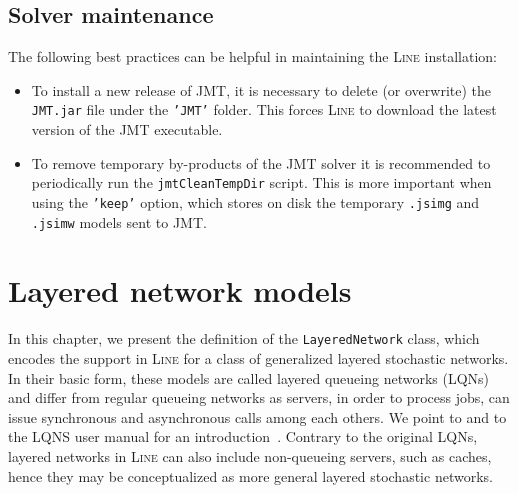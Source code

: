 \begin{MATLAB}
\section{Solver maintenance}
The following best practices can be helpful in maintaining the \textsc{Line} installation:
\begin{itemize}
\item To install a new release of JMT, it is necessary to delete (or overwrite) the \texttt{JMT.jar} file under the \texttt{'JMT'} folder. This forces \textsc{Line} to download the latest version of the JMT executable.
\item To remove temporary by-products of the JMT solver it is recommended to periodically run the \texttt{jmtCleanTempDir} script. This is more important when using the \texttt{'keep'} option, which stores on disk the temporary \texttt{.jsimg} and \texttt{.jsimw} models sent to JMT.
\end{itemize}
\end{MATLAB}



\chapter{Layered network models}
\label{Layered-network-models}
In this chapter, we present the definition of the \texttt{LayeredNetwork} class, which encodes the support in \textsc{Line} for a class of generalized layered stochastic networks. In their basic form, these models are called layered queueing networks (LQNs) and differ from regular queueing networks as servers, in order to process jobs, can issue synchronous and asynchronous calls among each others. We point to \cite{fran.ea09} and to the LQNS user manual for an introduction~\cite{lqns12}. Contrary to the original LQNs, layered networks in \textsc{Line} can also include non-queueing servers, such as caches, hence they may be conceptualized as more general layered stochastic networks.


